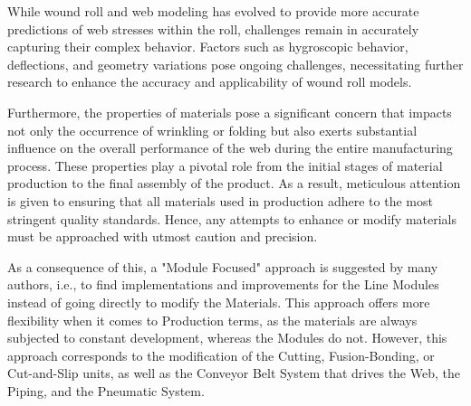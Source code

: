 
While wound roll and web modeling has evolved to provide more accurate predictions of web stresses within the roll, challenges remain in accurately capturing their complex behavior. Factors such as hygroscopic behavior, deflections, and geometry variations pose ongoing challenges, necessitating further research to enhance the accuracy and applicability of wound roll models.

Furthermore, the properties of materials pose a significant concern that impacts not only the occurrence of wrinkling or folding but also exerts substantial influence on the overall performance of the web during the entire manufacturing process. These properties play a pivotal role from the initial stages of material production to the final assembly of the product. As a result, meticulous attention is given to ensuring that all materials used in production adhere to the most stringent quality standards. Hence, any attempts to enhance or modify materials must be approached with utmost caution and precision.

As a consequence of this, a "Module Focused" approach is suggested by many authors, i.e., to find implementations and improvements for the Line Modules instead of going directly to modify the Materials. This approach offers more flexibility when it comes to Production terms, as the materials are always subjected to constant development, whereas the Modules do not. However, this approach corresponds to the modification of the Cutting, Fusion-Bonding, or Cut-and-Slip units, as well as the Conveyor Belt System that drives the Web, the Piping, and the Pneumatic System. 

